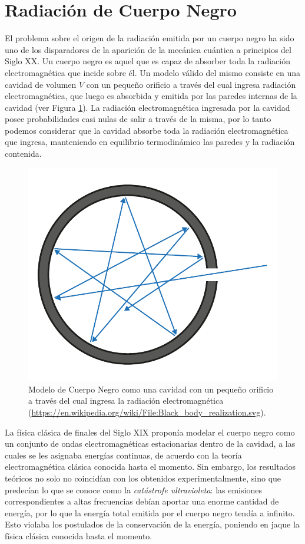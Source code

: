 \documentclass[a4paper,11pt]{article}
\begin{document}
\section{Radiación de Cuerpo Negro}

El problema sobre el origen de la radiación emitida por un cuerpo negro ha
sido uno de los disparadores de la aparición de la mecánica cuántica a
principios del Siglo XX.
Un cuerpo negro es aquel que es capaz de absorber toda la radiación
electromagnética que incide sobre él.
Un modelo válido del mismo consiste en una cavidad de volumen $V$ con un
pequeño orificio a través del cual ingresa radiación electromagnética, que
luego es absorbida y emitida por las paredes internas de la cavidad (ver
Figura \ref{fig:cuerpo-negro}).
La radiación electromagnética ingresada por la cavidad posee
probabilidades casi nulas de salir a través de la misma, por lo tanto podemos
considerar que la cavidad absorbe toda la radiación electromagnética que
ingresa, manteniendo en equilibrio termodinámico las paredes y la radiación
contenida.

\begin{figure}[b!]
\centering
\includegraphics[width=0.5\linewidth]{figs/cuerpo-negro.pdf}
\caption{Modelo de Cuerpo Negro como una cavidad con un pequeño orificio a
         través del cual ingresa la radiación electromagnética
         (\url{https://en.wikipedia.org/wiki/File:Black_body_realization.svg}).
         }
\label{fig:cuerpo-negro}
\end{figure}

La física clásica de finales del Siglo XIX proponía modelar el cuerpo negro
como un conjunto de ondas electromagnéticas estacionarias dentro de la
cavidad, a las cuales se les asignaba energías continuas, de acuerdo con la
teoría electromagnética clásica conocida hasta el momento.
Sin embargo, los resultados teóricos no solo no coincidían con los
obtenidos experimentalmente, sino que predecían lo que se conoce como la
\emph{catástrofe ultravioleta}: las emisiones correspondientes a altas
frecuencias debían aportar una enorme cantidad de energía, por lo que la
energía total emitida por el cuerpo negro tendía a infinito.
Esto violaba los postulados de la conservación de la energía, poniendo en
jaque la física clásica conocida hasta el momento.
\end{document}
